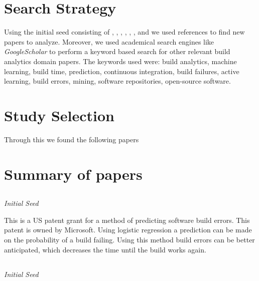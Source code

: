 \documentclass[]{book}
\begin{document}
\section{Search Strategy}\label{search-strategy}

Using the initial seed consisting of \citet{bird2017predicting},
\citet{beller2017oops}, \citet{rausch2017empirical},
\citet{beller2017travistorrent}, \citet{pinto2018work},
\citet{zhao2017impact}, \citet{widder2018m} and \citet{hilton2016usage}
we used references to find new papers to analyze. Moreover, we used
academical search engines like \emph{GoogleScholar} to perform a keyword
based search for other relevant build analytics domain papers. The
keywords used were: build analytics, machine learning, build time,
prediction, continuous integration, build failures, active learning,
build errors, mining, software repositories, open-source software.

\section{Study Selection}\label{study-selection}

Through this we found the following papers

\section{Summary of papers}\label{summary-of-papers}

\subsection{\texorpdfstring{\citet{bird2017predicting}}{@bird2017predicting}}\label{bird2017predicting}

\emph{Initial Seed}

This is a US patent grant for a method of predicting software build
errors. This patent is owned by Microsoft. Using logistic regression a
prediction can be made on the probability of a build failing. Using this
method build errors can be better anticipated, which decreases the time
until the build works again.

\subsection{\texorpdfstring{\citet{beller2017oops}}{@beller2017oops}}\label{beller2017oops}

\emph{Initial Seed}
\end{document}
